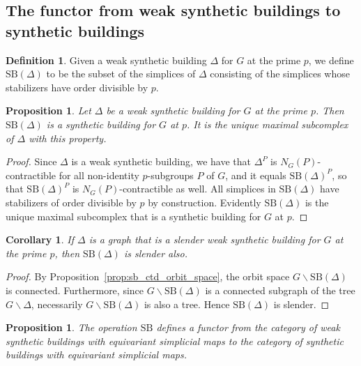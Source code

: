\documentclass[12pt]{amsart}
\theoremstyle{plain}
\newtheorem{proposition}[theorem]{Proposition}
\newtheorem{corollary}[theorem]{Corollary}
\theoremstyle{definition}
\newtheorem{definition}[theorem]{Definition}
\theoremstyle{remark}
\numberwithin{equation}{section}
\newcommand{\bs}{\backslash}
\begin{document}
\subsection{The functor from weak synthetic buildings to synthetic buildings}

\begin{definition}
    Given a weak synthetic building $\Delta$ for $G$ at the prime $p$, we define $\mathrm{SB}(\Delta)$ to be the subset of the simplices of $\Delta$ consisting of the simplices whose stabilizers have order divisible by $p$.
\end{definition}

\begin{proposition}\label{prop:weak_to_strong}
    Let $\Delta$ be a weak synthetic building for $G$ at the prime $p$. Then $\mathrm{SB}(\Delta)$ is a synthetic building for $G$ at $p$. It is the unique maximal subcomplex of $\Delta$ with this property.
\end{proposition}
\begin{proof}
    Since $\Delta$ is a weak synthetic building, we have that $\Delta^P$ is $N_G(P)$-contractible for all non-identity $p$-subgroups $P$ of $G$, and it equals $\mathrm{SB}(\Delta)^P$, so that $\mathrm{SB}(\Delta)^P$ is $N_G(P)$-contractible as well. All simplices in $\mathrm{SB}(\Delta)$ have stabilizers of order divisible by $p$ by construction. Evidently $\mathrm{SB}(\Delta)$ is the unique maximal subcomplex that is a synthetic building for $G$ at $p$.
\end{proof}

\begin{corollary}\label{cor:weakSlend_to_Slend}
    If $\Delta$ is a graph that is a slender weak synthetic building for $G$ at the prime $p$, then $\mathrm{SB}(\Delta)$ is slender also.
\end{corollary}
\begin{proof}
    By Proposition~\ref{prop:sb_ctd_orbit_space}, the orbit space $G\bs \mathrm{SB}(\Delta)$ is connected. Furthermore, since $G\bs \mathrm{SB}(\Delta)$ is a connected subgraph of the tree $G\bs\Delta$, necessarily $G\bs \mathrm{SB}(\Delta)$ is also a tree. Hence $\mathrm{SB}(\Delta)$ is slender. 
\end{proof}

\begin{proposition}
\label{SB-is-functorial-proposition}
    The operation $\mathrm{SB}$ defines a functor from the category of weak synthetic buildings with equivariant simplicial maps to the category of synthetic buildings with equivariant simplicial maps.
\end{proposition}
\end{document}
